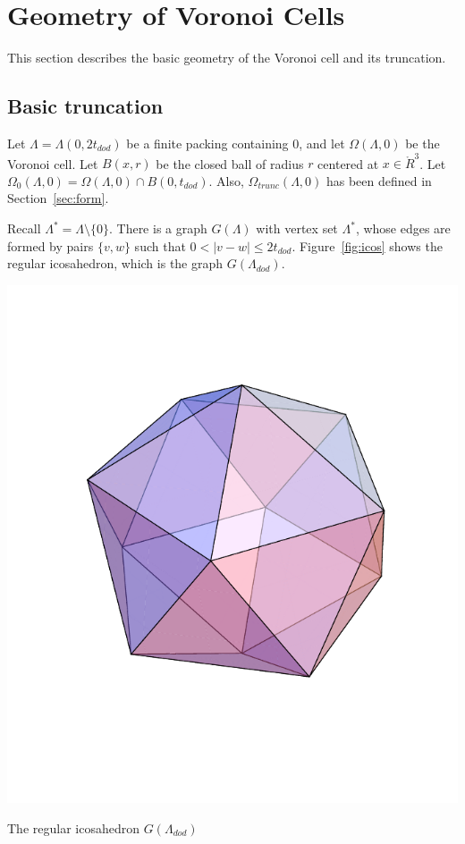 \documentclass{article} %
\begin{document}
\section{Geometry of Voronoi Cells}

This section describes the basic geometry of the Voronoi cell and its
truncation.

\subsection{Basic truncation}
\label{sec:in-ex}

Let $\Lambda = \Lambda(0,2t_{dod})$ be a finite packing containing
$0$, and let $\Omega(\Lambda,0)$ be the Voronoi cell. Let $B(x,r)$ be
the closed ball of radius $r$ centered at $x\in\ring{R}^3$. Let
$\Omega_0(\Lambda,0) = \Omega(\Lambda,0)\cap B(0,t_{dod})$. Also,
$\Omega_{trunc}(\Lambda,0)$ has been defined in
Section~\ref{sec:form}.

Recall $\Lambda^* = \Lambda\setminus\{0\}$.  There is a graph $G(\Lambda)$
with vertex set $\Lambda^*$, whose edges are formed by pairs
$\{v,w\}$ such that $0<|v-w|\le 2t_{dod}$.  Figure~\ref{fig:icos}
shows the regular icosahedron, which is the graph $G(\Lambda_{dod})$.

\begin{Figure}[htb]
  \begin{center}
    \includegraphics[scale=0.4]{images/icos.pdf}
  \end{center}
  \caption{The regular icosahedron $G(\Lambda_{dod})$}
  \label{fig:icos}
\end{Figure}
\end{document}

